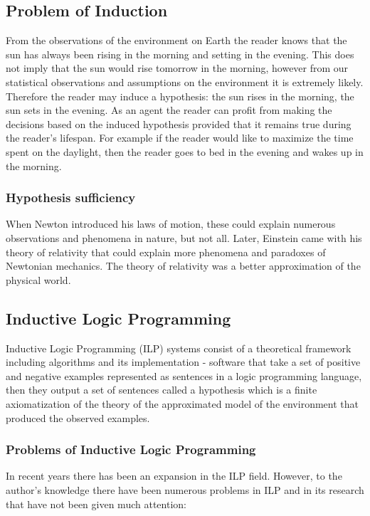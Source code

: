 \subsection{Problem of Induction}
From the observations of the environment on Earth the reader knows that the sun has always been rising in the morning and setting in the evening. This does not imply that the sun would rise tomorrow in the morning, however from our statistical observations and assumptions on the environment it is extremely likely. Therefore the reader may induce a hypothesis: the sun rises in the morning, the sun sets in the evening. As an agent the reader can profit from making the decisions based on the induced hypothesis provided that it remains true during the reader's lifespan. For example if the reader would like to maximize the time spent on the daylight, then the reader goes to bed in the evening and wakes up in the morning.

\subsubsection{Hypothesis sufficiency}
When Newton introduced his laws of motion, these could explain numerous observations and phenomena in nature, but not all. Later, Einstein came with his theory of relativity that could explain more phenomena and paradoxes of Newtonian mechanics. The theory of relativity was a better approximation of the physical world.

\subsection{Inductive Logic Programming}
Inductive Logic Programming (ILP) systems consist of a theoretical framework including algorithms and its implementation - software that take a set of positive and negative examples represented as sentences in a logic programming language, then they output a set of sentences called a hypothesis which is a finite axiomatization of the theory of the approximated model of the environment that produced the observed examples.

\subsubsection{Problems of Inductive Logic Programming}
In recent years there has been an expansion in the ILP field. However, to the author's knowledge there have been numerous problems in ILP and in its research that have not been given much attention:

